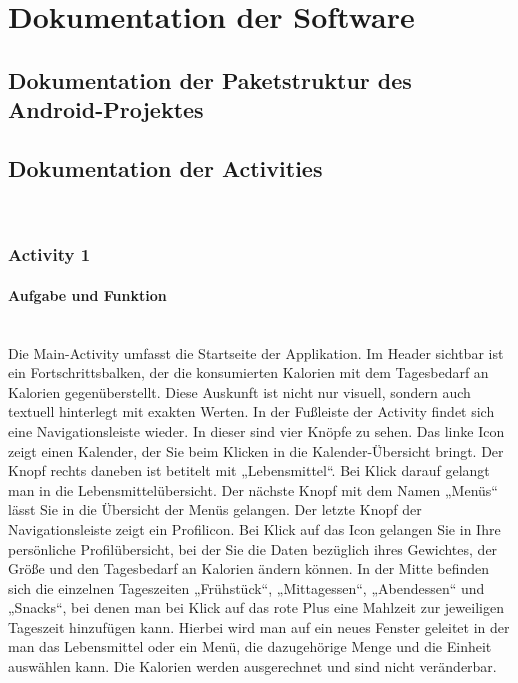 \section{Dokumentation der Software}
\label{concept}

\subsection{Dokumentation der Paketstruktur des Android-Projektes}

\subsection{Dokumentation der Activities}\\


\subsubsection{Activity 1}
\setcounter{tocdepth}{4} 
\setcounter{secnumdepth}{4}
\paragraph{Aufgabe und Funktion}\\
Die Main-Activity umfasst die Startseite der Applikation. Im Header sichtbar ist ein Fortschrittsbalken, der die konsumierten Kalorien mit dem Tagesbedarf an Kalorien gegenüberstellt. Diese Auskunft ist nicht nur visuell, sondern auch textuell hinterlegt mit exakten Werten. In der Fußleiste der Activity findet sich eine Navigationsleiste wieder. In dieser sind vier Knöpfe zu sehen. Das linke Icon zeigt einen Kalender, der Sie beim Klicken in die Kalender-Übersicht bringt. Der Knopf rechts daneben ist betitelt mit „Lebensmittel“. Bei Klick darauf gelangt man in die Lebensmittelübersicht. Der nächste Knopf mit dem Namen „Menüs“ lässt Sie in die Übersicht der Menüs gelangen. Der letzte Knopf der Navigationsleiste zeigt ein Profilicon. Bei Klick auf das Icon gelangen Sie in Ihre persönliche Profilübersicht, bei der Sie die Daten bezüglich ihres Gewichtes, der Größe und den Tagesbedarf an Kalorien ändern können.
In der Mitte befinden sich die einzelnen Tageszeiten „Frühstück“, „Mittagessen“, „Abendessen“ und „Snacks“, bei denen man bei Klick auf das rote Plus eine Mahlzeit zur jeweiligen Tageszeit hinzufügen kann. Hierbei wird man auf ein neues Fenster geleitet in der man das Lebensmittel oder ein Menü, die dazugehörige Menge und die Einheit auswählen kann. Die Kalorien werden ausgerechnet und sind nicht veränderbar.

